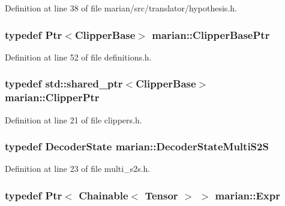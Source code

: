 Definition at line 38 of file marian/src/translator/hypothesis.\+h.

\subsubsection[{\texorpdfstring{Clipper\+Base\+Ptr}{ClipperBasePtr}}]{\setlength{\rightskip}{0pt plus 5cm}typedef {\bf Ptr}$<${\bf Clipper\+Base}$>$ {\bf marian\+::\+Clipper\+Base\+Ptr}}\hypertarget{namespacemarian_ae7082987f4bcf1b02bf5b23e1ebebacb}{}\label{namespacemarian_ae7082987f4bcf1b02bf5b23e1ebebacb}


Definition at line 52 of file definitions.\+h.

\subsubsection[{\texorpdfstring{Clipper\+Ptr}{ClipperPtr}}]{\setlength{\rightskip}{0pt plus 5cm}typedef std\+::shared\+\_\+ptr$<${\bf Clipper\+Base}$>$ {\bf marian\+::\+Clipper\+Ptr}}\hypertarget{namespacemarian_aae0207a20df3fdd1b9913aa55eafb8b9}{}\label{namespacemarian_aae0207a20df3fdd1b9913aa55eafb8b9}


Definition at line 21 of file clippers.\+h.

\subsubsection[{\texorpdfstring{Decoder\+State\+Multi\+S2S}{DecoderStateMultiS2S}}]{\setlength{\rightskip}{0pt plus 5cm}typedef {\bf Decoder\+State} {\bf marian\+::\+Decoder\+State\+Multi\+S2S}}\hypertarget{namespacemarian_a137d04212ba21a89d625a75676d91939}{}\label{namespacemarian_a137d04212ba21a89d625a75676d91939}


Definition at line 23 of file multi\+\_\+s2s.\+h.

\subsubsection[{\texorpdfstring{Expr}{Expr}}]{\setlength{\rightskip}{0pt plus 5cm}typedef {\bf Ptr}$<$ {\bf Chainable}$<$ {\bf Tensor} $>$ $>$ {\bf marian\+::\+Expr}}\hypertarget{namespacemarian_a498d8baf75b754011078b890b39c8e12}{}\label{namespacemarian_a498d8baf75b754011078b890b39c8e12}


